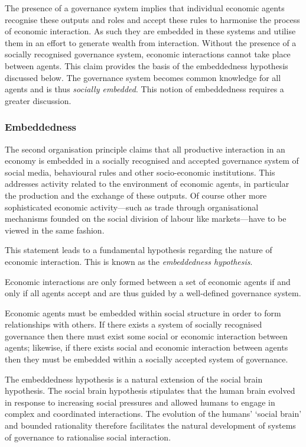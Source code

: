 The presence of a governance system implies that individual economic agents recognise these outputs and roles and accept these rules to harmonise the process of economic interaction. As such they are embedded in these systems and utilise them in an effort to generate wealth from interaction. Without the presence of a socially recognised governance system, economic interactions cannot take place between agents. This claim provides the basis of the embeddedness hypothesis discussed below. The governance system becomes common knowledge for all agents and is thus \emph{socially embedded}. This notion of embeddedness requires a greater discussion.

\subsubsection{Embeddedness}

The second organisation principle claims that all productive interaction in an economy is embedded in a socially recognised and accepted governance system of social media, behavioural rules and other socio-economic institutions. This addresses activity related to the environment of economic agents, in particular the production and the exchange of these outputs. Of course other more sophisticated economic activity---such as trade through organisational mechanisms founded on the social division of labour like markets---have to be viewed in the same fashion.

This statement leads to a fundamental hypothesis regarding the nature of economic interaction. This is known as the \emph{embeddedness hypothesis}.
\begin{hypothesis} \label{ax:embeddednesshypothesis}
Economic interactions are only formed between a set of economic agents if and only if all agents accept and are thus guided by a well-defined governance system.
\end{hypothesis}
Economic agents must be embedded within social structure in order to form relationships with others. If there exists a system of socially recognised governance then there must exist some social or economic interaction between agents; likewise, if there exists social and economic interaction between agents then they must be embedded within a socially accepted system of governance.

The embeddedness hypothesis is a natural extension of the social brain hypothesis. The social brain hypothesis stipulates that the human brain evolved in response to increasing social pressures and allowed humans to engage in complex and coordinated interactions. The evolution of the humans' `social brain' and bounded rationality therefore facilitates the natural development of systems of governance to rationalise social interaction. 

